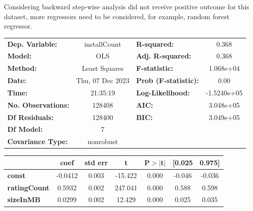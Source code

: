 Considering backward step-wise analysis did not receive positive outcome for this dataset, more regressors need to be considered, for example, random forest regressor. 

\begin{table}
    \centering
    \small
    \begin{center}
        \begin{tabular}{lclc}
        \toprule
        \textbf{Dep. Variable:}       &   installCount   & \textbf{  R-squared:         } &      0.368   \\
        \textbf{Model:}               &       OLS        & \textbf{  Adj. R-squared:    } &      0.368   \\
        \textbf{Method:}              &  Least Squares   & \textbf{  F-statistic:       } &  1.068e+04   \\
        \textbf{Date:}                & Thu, 07 Dec 2023 & \textbf{  Prob (F-statistic):} &      0.00    \\
        \textbf{Time:}                &     21:35:19     & \textbf{  Log-Likelihood:    } & -1.5240e+05  \\
        \textbf{No. Observations:}    &      128408      & \textbf{  AIC:               } &  3.048e+05   \\
        \textbf{Df Residuals:}        &      128400      & \textbf{  BIC:               } &  3.049e+05   \\
        \textbf{Df Model:}            &           7      & \textbf{                     } &              \\
        \textbf{Covariance Type:}     &    nonrobust     & \textbf{                     } &              \\
        \bottomrule
        \end{tabular}
        \begin{tabular}{lcccccc}
                                      & \textbf{coef} & \textbf{std err} & \textbf{t} & \textbf{P$> |$t$|$} & \textbf{[0.025} & \textbf{0.975]}  \\
        \midrule
        \textbf{const}                &      -0.0412  &        0.003     &   -15.422  &         0.000        &       -0.046    &       -0.036     \\
        \textbf{ratingCount}          &       0.5932  &        0.002     &   247.041  &         0.000        &        0.588    &        0.598     \\
        \textbf{sizeInMB}             &       0.0299  &        0.002     &    12.429  &         0.000        &        0.025    &        0.035     \\

\end{tabular}
\end{center}
\end{table}
